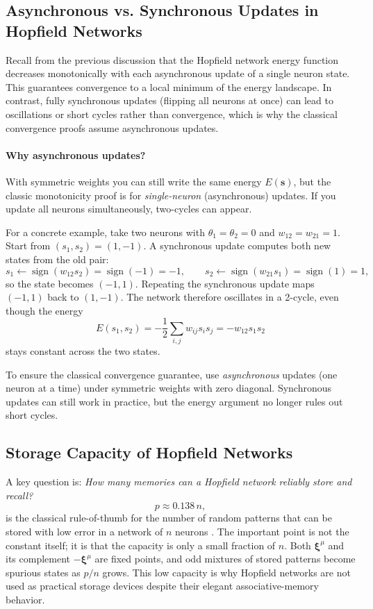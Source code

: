 \subsection{Asynchronous vs. Synchronous Updates in Hopfield Networks}
\label{sec:hopfield_async_vs_sync}

Recall from the previous discussion that the Hopfield network energy function decreases monotonically with each asynchronous update of a single neuron state. This guarantees convergence to a local minimum of the energy landscape. In contrast, fully synchronous updates (flipping all neurons at once) can lead to oscillations or short cycles rather than convergence, which is why the classical convergence proofs assume asynchronous updates.

\paragraph{Why asynchronous updates?}
With symmetric weights you can still write the same energy \(E(\mathbf{s})\), but the classic monotonicity proof is for \emph{single-neuron} (asynchronous) updates. If you update all neurons simultaneously, two-cycles can appear.

For a concrete example, take two neurons with \(\theta_1=\theta_2=0\) and \(w_{12}=w_{21}=1\). Start from \((s_1,s_2)=(1,-1)\). A synchronous update computes both new states from the old pair:
\[
s_1 \leftarrow \operatorname{sign}(w_{12}s_2)=\operatorname{sign}(-1)=-1,\qquad
s_2 \leftarrow \operatorname{sign}(w_{21}s_1)=\operatorname{sign}(1)=1,
\]
so the state becomes \((-1,1)\). Repeating the synchronous update maps \((-1,1)\) back to \((1,-1)\). The network therefore oscillates in a 2-cycle, even though the energy
\[
E(s_1,s_2) = -\frac{1}{2}\sum_{i,j} w_{ij}s_is_j = -w_{12}s_1s_2
\]
stays constant across the two states.

To ensure the classical convergence guarantee, use \emph{asynchronous} updates (one neuron at a time) under symmetric weights with zero diagonal. Synchronous updates can still work in practice, but the energy argument no longer rules out short cycles.

\subsection{Storage Capacity of Hopfield Networks}
\label{sec:hopfield_storage_capacity_of_hopfield_networks}

A key question is: \emph{How many memories can a Hopfield network reliably store and recall?}
\[
p \approx 0.138\, n,
\]
is the classical rule-of-thumb for the number of random patterns that can be stored with low error in a network of \(n\) neurons \citep{McEliece1987}. The important point is not the constant itself; it is that the capacity is only a small fraction of \(n\). Both \(\mathbf{\xi}^\mu\) and its complement \(-\mathbf{\xi}^\mu\) are fixed points, and odd mixtures of stored patterns become spurious states as \(p/n\) grows. This low capacity is why Hopfield networks are not used as practical storage devices despite their elegant associative-memory behavior.

